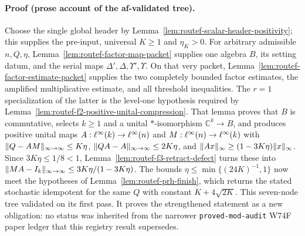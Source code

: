 \paragraph{Proof (prose account of the af-validated tree).}
Choose the single global header by Lemma~\ref{lem:routef-scalar-header-positivity}; this
supplies the pre-input, universal $K\ge1$ and $\eta_K>0$.  For arbitrary admissible
$n,Q,\eta$, Lemma~\ref{lem:routef-factor-map-packet} supplies one algebra $B$, its setting
datum, and the serial maps $\Delta',\Delta,\Upsilon',\Upsilon$.  On that very packet,
Lemma~\ref{lem:routef-factor-estimate-packet} supplies the two completely bounded factor
estimates, the amplified multiplicative estimate, and all threshold inequalities.
The $r=1$ specialization of the latter is the level-one hypothesis required by
Lemma~\ref{lem:routef-f2-positive-unital-compression}.  That lemma proves that $B$ is
commutative, selects $k\ge1$ and a unital $*$-isomorphism $\mathbb C^k\to B$, and produces
positive unital maps $A:\ell^{\infty}(k)\to\ell^{\infty}(n)$ and $M:\ell^{\infty}(n)\to\ell^{\infty}(k)$ with
$\lVert Q-AM\rVert_{\infty\to\infty}\le K\eta$,
$\lVert QA-A\rVert_{\infty\to\infty}\le2K\eta$, and
$\lVert Ax\rVert_\infty\ge(1-3K\eta)\lVert x\rVert_\infty$.  Since $3K\eta\le1/8<1$,
Lemma~\ref{lem:routef-f3-retract-defect} turns these into
$\lVert MA-I_k\rVert_{\infty\to\infty}\le3K\eta/(1-3K\eta)$.  The bounds
$\eta\le\min\{(24K)^{-1},1\}$ now meet the hypotheses of
Lemma~\ref{lem:routef-prh-finish}, which returns the stated stochastic idempotent for the
same $Q$ with constant $K+4\sqrt{2K}$.  This seven-node tree validated on its first pass.
It proves the strengthened statement as a new obligation: no status was inherited from
the narrower \texttt{proved-mod-audit} W74F paper ledger that this registry result supersedes.
